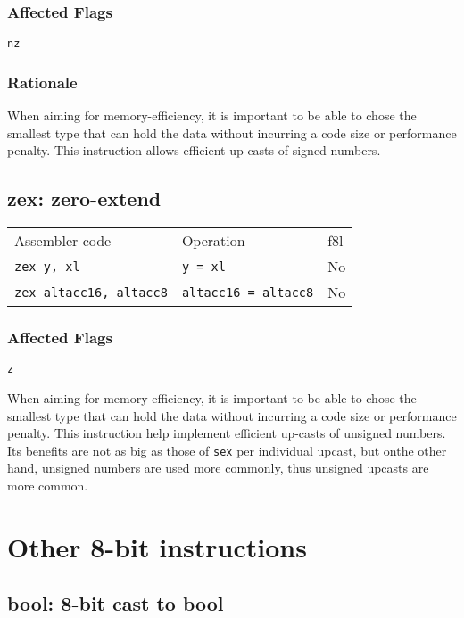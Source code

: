 \documentclass{book}
\begin{document}
\subsubsection*{Affected Flags}

\texttt{nz}

\subsubsection*{Rationale}

When aiming for memory-efficiency, it is important to be able to chose the smallest type that can hold the data without incurring a code size or performance penalty. This instruction allows efficient up-casts of signed numbers.


\subsection{zex: zero-extend}

\begin{tabular}{l l l}
Assembler code                 & Operation                   & f8l \\
\texttt{zex y, xl}             & \texttt{y = xl}             & No \\
\texttt{zex altacc16, altacc8} & \texttt{altacc16 = altacc8} & No \\
\end{tabular}

\subsubsection*{Affected Flags}

\texttt{z}

When aiming for memory-efficiency, it is important to be able to chose the smallest type that can hold the data without incurring a code size or performance penalty. This instruction help implement efficient up-casts of unsigned numbers. Its benefits are not as big as those of \texttt{sex} per individual upcast, but onthe other hand, unsigned numbers are used more commonly, thus unsigned upcasts are more common.


\section{Other 8-bit instructions}

\subsection{bool: 8-bit cast to bool}
\end{document}
